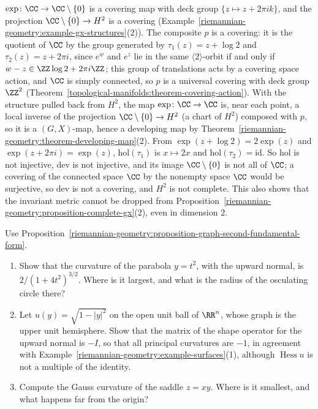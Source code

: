 \begin{solution}
$\exp \colon \CC \to \CC \setminus \{0\}$ is a covering map with deck group $\{z \mapsto z + 2\pi ik\}$, and the projection $\CC \setminus \{0\} \to H^2$ is a covering (Example~\ref{riemannian-geometry:example-gx-structures}(2)). The
composite $p$ is a covering: it is the quotient of $\CC$ by the group generated by $\tau_1(z) = z + \log 2$ and $\tau_2(z) = z + 2\pi i$, since $e^w$ and $e^z$ lie in the same $\langle 2\rangle$-orbit if and only if
$w - z \in \ZZ\log 2 + 2\pi i\ZZ$; this group of translations acts by a covering space action, and $\CC$ is simply connected, so $p$ is a universal covering with deck group $\ZZ^2$
(Theorem~\ref{topological-manifolds:theorem-covering-action}). With the structure pulled back from $H^2$, the map $\exp \colon \CC \to \CC$ is, near each point, a local inverse of the projection $\CC \setminus \{0\} \to H^2$ (a chart of $H^2$)
composed with $p$, so it is a $(G, X)$-map, hence a developing map by Theorem~\ref{riemannian-geometry:theorem-developing-map}(2). From $\exp(z + \log 2) = 2\exp(z)$ and $\exp(z + 2\pi i) = \exp(z)$, $\mathrm{hol}(\tau_1)$ is
$x \mapsto 2x$ and $\mathrm{hol}(\tau_2) = \mathrm{id}$. So $\mathrm{hol}$ is not injective, $\mathrm{dev}$ is not injective, and its image $\CC \setminus \{0\}$ is not all of $\CC$; a covering of the connected space $\CC$ by the
nonempty space $\CC$ would be surjective, so $\mathrm{dev}$ is not a covering, and $H^2$ is not complete. This also shows that the invariant metric cannot be dropped from Proposition~\ref{riemannian-geometry:proposition-complete-gx}(2), even
in dimension $2$.
\end{solution}

\begin{exercise}\label{riemannian-geometry:exercise-graph-curvatures}
Use Proposition~\ref{riemannian-geometry:proposition-graph-second-fundamental-form}.
\begin{enumerate}
\item Show that the curvature of the parabola $y = t^2$, with the upward normal, is $2/(1 + 4t^2)^{3/2}$. Where is it largest, and what is the radius of the osculating circle there?
\item Let $u(y) = \sqrt{1 - |y|^2}$ on the open unit ball of $\RR^n$, whose graph is the upper unit hemisphere. Show that the matrix of the shape operator for the upward normal is $-I$, so that all
principal curvatures are $-1$, in agreement with Example~\ref{riemannian-geometry:example-surfaces}(1), although $\operatorname{Hess}u$ is not a multiple of the identity.
\item Compute the Gauss curvature of the saddle $z = xy$. Where is it smallest, and what happens far from the origin?
\end{enumerate}
\end{exercise}

